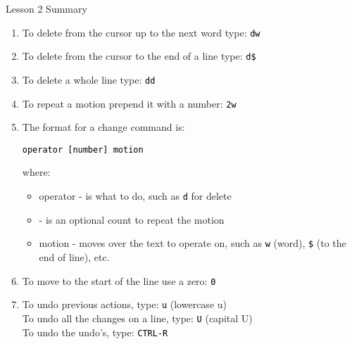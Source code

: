 \documentclass[handout, 10pt]{beamer}
\newcommand{\code}[2][black]{\textcolor{#1}{\colorbox{codegray}{\texttt{#2}}}}
\begin{document}
\begin{frame}{Lesson 2 Summary}
	\begin{enumerate}
		\item To delete from the cursor up to the next word type: \code{dw}

		\item To delete from the cursor to the end of a line type: \code{d\$}

		\item To delete a whole line type: \code{dd}

		\item To repeat a motion prepend it with a number: \code{2w}

		\item The format for a change command is: \\
		\begin{center}
			\code{operator  [number]  motion}
		\end{center}
		where:
		\begin{itemize}
			\item operator - is what to do, such as \code{d} for delete

			\item \text{[number]} - is an optional count to repeat the motion

			\item motion   - moves over the text to operate on, such as
				\code{w} (word), \code{\$} (to the end of line), etc.
		\end{itemize}

		\item To move to the start of the line use a zero: \code{0}

		\item To undo previous actions, type: \code{u} (lowercase u) \\
		To undo all the changes on a line, type: \code{U} (capital U) \\
		To undo the undo's, type: \code{CTRL-R}
	\end{enumerate}
\end{frame}
\end{document}
